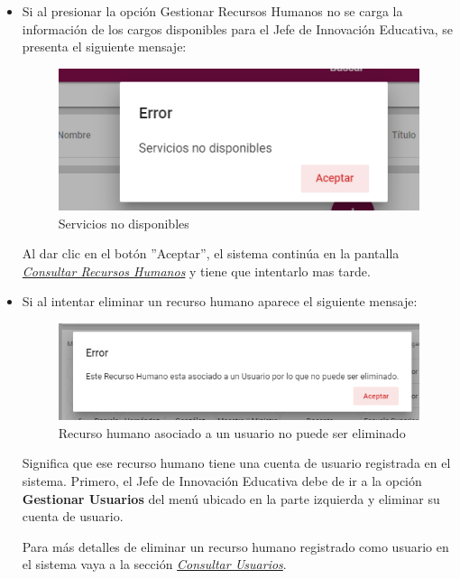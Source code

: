           \begin{itemize}
                \item Si al  presionar la opción Gestionar Recursos Humanos no se carga la información de los cargos disponibles para el Jefe de Innovación Educativa, se presenta el siguiente mensaje:

             \begin{figure}[H]
                \centering
                \includegraphics[width=0.4\linewidth]{images/SP1/MSGSN}
                \caption{Servicios no disponibles}
                \label{SND}

            \end{figure}

                    Al dar clic en el botón ''Aceptar'', el sistema continúa en la pantalla  \hyperlink{consultarRH}{\textit{Consultar Recursos Humanos}} y tiene que intentarlo  mas tarde.


              \item Si al intentar eliminar un recurso humano aparece el siguiente mensaje:
                \begin{figure}[H]
                   \centering
                   \includegraphics[width=0.4\linewidth]{images/SP1/MSG56}
                    \caption{Recurso humano asociado a un usuario no puede ser eliminado}
                   \label{mensaje56}
                \end{figure}

                Significa que ese recurso humano tiene una cuenta de usuario registrada en el sistema. Primero, el Jefe de Innovación Educativa debe de ir a la opción \textbf{Gestionar Usuarios} del menú ubicado en la parte izquierda y eliminar su cuenta de usuario.

                Para más detalles de eliminar un recurso humano registrado como usuario en el sistema vaya a la sección \hyperlink{consultarUs}{\textit{Consultar Usuarios}}.


           \end{itemize}

